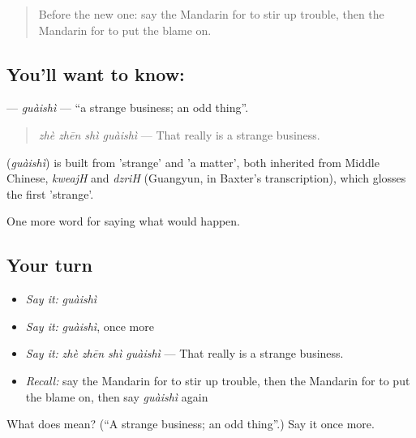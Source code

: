 \label{lesson:ZH-C539-guaishi}



\begin{quote}
Before the new one: say the Mandarin for to stir up trouble, then the Mandarin for to put the blame on.
\end{quote}

\subsection*{You'll want to know: }
\textbf{} — \emph{guàishì} — \textquotedblleft{}a strange business; an odd thing\textquotedblright{}.

\begin{quote}
\textbf{} \emph{zhè zhēn shì guàishì} — That really is a strange business.
\end{quote}

\begin{cousinweb}
\textbf{} (\emph{guàishì}) is built from  'strange' and  'a matter', both inherited from Middle Chinese, \emph{kweajH} and \emph{dzriH} (Guangyun, in Baxter's transcription), which glosses the first 'strange'.
\end{cousinweb}

\begin{grammarlens}[title={What you've built}]
One more word for saying what would happen.
\end{grammarlens}

\subsection*{Your turn}
\begin{itemize}
\raggedright
  \item \emph{Say it:} \emph{guàishì}
  \item \emph{Say it:} \emph{guàishì}, once more
  \item \emph{Say it:} \emph{zhè zhēn shì guàishì} — That really is a strange business.
  \item \emph{Recall:} say the Mandarin for to stir up trouble, then the Mandarin for to put the blame on, then say \emph{guàishì} again
\end{itemize}

\begin{tcolorbox}[breakable,colback=teal!4,colframe=teal!35!black,title={Before you move on}]
What does  mean? (\textquotedblleft{}A strange business; an odd thing\textquotedblright{}.) Say it once more.
\end{tcolorbox}
